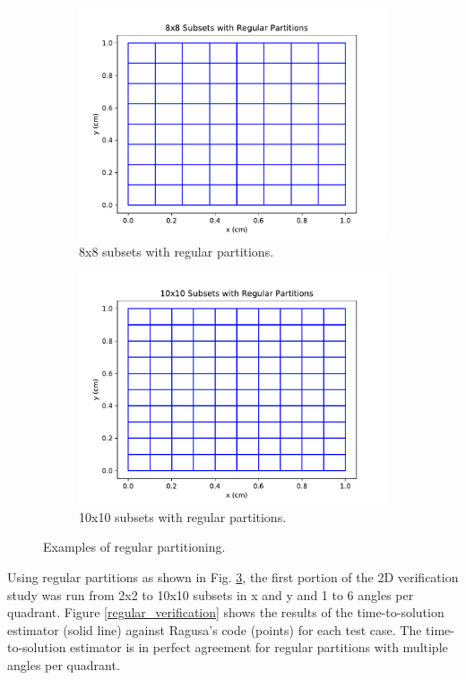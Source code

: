 \begin{figure}[H]
\begin{subfigure}[b]{0.45\textwidth}
  \includegraphics[width=\textwidth]{../cut_line_files/8_regular.pdf}
  \caption{8x8 subsets with regular partitions.}
  \label{8regular}
\end{subfigure}
\begin{subfigure}[b]{0.45\textwidth}
  \includegraphics[width=\textwidth]{../cut_line_files/10_regular.pdf}
  \caption{10x10 subsets with regular partitions.}
  \label{10regular}
\end{subfigure}
\caption{Examples of regular partitioning.}
\label{regular_partitions}
\end{figure}

Using regular partitions as shown in Fig. \ref{regular_partitions}, the first portion of the 2D verification study was run from 2x2 to 10x10 subsets in x and y and 1 to 6 angles per quadrant.  Figure \ref{regular_verification} shows the results of the time-to-solution estimator (solid line) against Ragusa's code (points) for each test case. The time-to-solution estimator is in perfect agreement for regular partitions with multiple angles per quadrant.

